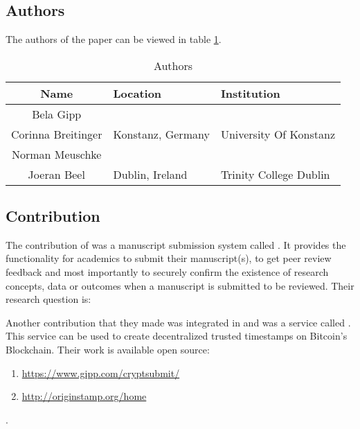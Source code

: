 
\section*{\citet{2017_Gipp}}

\subsection*{Authors}
The authors of the paper can be viewed in table \ref{tab:2017_Gipp_Authors}.
\begin{longtable}{ |c|p{4cm}|p{5cm}| }
	\caption{Authors} \label{tab:2017_Gipp_Authors} \\
	\hline
 	\cellcolor{Gray}Name & \cellcolor{Gray}Location & \cellcolor{Gray}Institution \\ [0.5ex] 
 	\hline\hline
 	\endhead
	 Bela Gipp &  \multirow{3}{*}{Konstanz, Germany} & \multirow{3}{5cm}{\centering University Of Konstanz} \\
	 \cline{1-1}
	 Corinna Breitinger &  & \\
	 \cline{1-1}
	 Norman Meuschke &  & \\
	 \hline
	 Joeran Beel & Dublin, Ireland & Trinity College Dublin \\
	\hline
\end{longtable}


\subsection*{Contribution}
The contribution of \citet{2017_Gipp} was a manuscript submission system called . It provides the functionality for academics to submit their manuscript(s), to get peer review feedback and most importantly to securely confirm the existence of research concepts, data or outcomes when a manuscript is submitted to be reviewed. Their research question is:
\begin{displayquote}
\end{displayquote}
Another contribution that they made was integrated in  and was a service called . This service can be used to create decentralized trusted timestamps on Bitcoin's Blockchain.
Their work is available open source:
\begin{enumerate}[label={\arabic*)},font={\color{red!50!black}\bfseries}]
	\item {} \url{https://www.gipp.com/cryptsubmit/}
	\item {} \url{http://originstamp.org/home}
\end{enumerate}.

